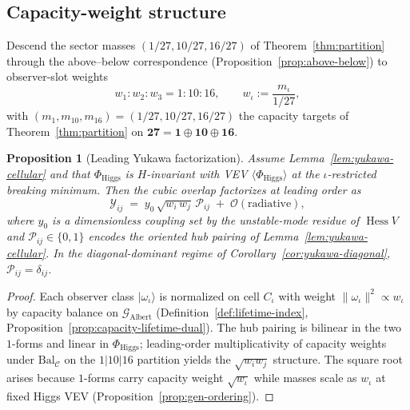 \documentclass[aps,prd,onecolumn,amsmath,amssymb,nofootinbib,11pt]{revtex4-2}
\numberwithin{equation}{section}
\theoremstyle{plain}
\newtheorem{proposition}[theorem]{Proposition}
\theoremstyle{definition}
\theoremstyle{remark}
\newcommand{\Hess}{\operatorname{Hess}}
\begin{document}
\subsection{Capacity-weight structure}
\label{sec:yukawa:weights}

Descend the sector masses $(1/27,10/27,16/27)$ of Theorem~\ref{thm:partition}
through the above--below correspondence (Proposition~\ref{prop:above-below})
to observer-slot weights
\begin{equation}\label{eq:yukawa-weights}
  w_1:w_2:w_3 = 1:10:16,
  \qquad
  w_\iota := \frac{m_\iota}{1/27},
\end{equation}
with $(m_1,m_{10},m_{16})=(1/27,10/27,16/27)$ the capacity targets of
Theorem~\ref{thm:partition} on $\mathbf{27}=\mathbf{1}\oplus\mathbf{10}\oplus\mathbf{16}$.

\begin{proposition}[Leading Yukawa factorization]\label{prop:yukawa-factor}
Assume Lemma~\ref{lem:yukawa-cellular} and that $\Phi_{\mathrm{Higgs}}$ is
$H$-invariant with VEV $\langle\Phi_{\mathrm{Higgs}}\rangle$ at the
$\iota$-restricted breaking minimum. Then the cubic overlap factorizes at
leading order as
\begin{equation}\label{eq:yukawa-factor}
  \mathcal{Y}_{ij}
  \;=\;
  y_0\,\sqrt{w_i\,w_j}\,\mathcal{P}_{ij}
  \;+\;\mathcal{O}(\text{radiative}),
\end{equation}
where $y_0$ is a dimensionless coupling set by the unstable-mode residue of
$\Hess V$ and $\mathcal{P}_{ij}\in\{0,1\}$ encodes the oriented hub pairing
of Lemma~\ref{lem:yukawa-cellular}. In the diagonal-dominant regime of
Corollary~\ref{cor:yukawa-diagonal}, $\mathcal{P}_{ij}=\delta_{ij}$.
\end{proposition}

\begin{proof}
Each observer class $|\omega_\iota\rangle$ is normalized on cell $C_\iota$ with
weight $\|{\omega_\iota}\|^2\propto w_\iota$ by capacity balance on
$\mathcal{G}_{\mathrm{Albert}}$ (Definition~\ref{def:lifetime-index},
Proposition~\ref{prop:capacity-lifetime-dual}). The hub pairing is bilinear
in the two $1$-forms and linear in $\Phi_{\mathrm{Higgs}}$; leading-order
multiplicativity of capacity weights under $\mathrm{Bal}_{\mathcal{C}}$ on
the $1|10|16$ partition yields the $\sqrt{w_i w_j}$ structure. The square
root arises because $1$-forms carry capacity weight $\sqrt{w_\iota}$ while
masses scale as $w_\iota$ at fixed Higgs VEV
(Proposition~\ref{prop:gen-ordering}).
\end{proof}
\end{document}
